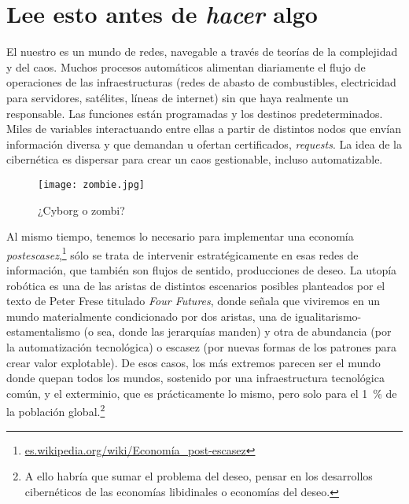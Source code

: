 \chapter{Lee esto antes de \emph{hacer} algo}
\label{cha:antesalgo}

El nuestro es un mundo de redes, navegable a través de teorías de la complejidad y del caos. Muchos procesos automáticos alimentan diariamente el flujo de operaciones de las infraestructuras (redes de abasto de combustibles, electricidad para servidores, satélites, líneas de internet) sin que haya realmente un responsable. Las funciones están programadas y los destinos predeterminados. Miles de variables interactuando entre ellas a partir de distintos nodos que envían información diversa y que demandan u ofertan certificados, \emph{requests}. La idea de la cibernética es dispersar para crear un caos gestionable, incluso automatizable.

\begin{figure}[htbp]
	\centering
	\texttt{[image: zombie.jpg]}
	\caption{¿Cyborg o zombi?}
	\label{fig:cyberzombie}
\end{figure}

Al mismo tiempo, tenemos lo necesario para implementar una economía \emph{postescasez},\footnote{\url{es.wikipedia.org/wiki/Economía\_post-escasez}} sólo se trata de intervenir estratégicamente en esas redes de información, que también son flujos de sentido, producciones de deseo. La utopía robótica es una de las aristas de distintos escenarios posibles planteados por el texto de Peter Frese titulado \emph{Four Futures}, donde señala que viviremos en un mundo materialmente condicionado por dos aristas, una de igualitarismo-estamentalismo (o sea, donde las jerarquías manden) y otra de abundancia (por la automatización tecnológica) o escasez (por nuevas formas de los patrones para crear valor explotable). De esos casos, los más extremos parecen ser el mundo donde quepan todos los mundos, sostenido por una infraestructura tecnológica común, y el exterminio, que es prácticamente lo mismo, pero solo para el 1~\% de la población global.\footnote{A ello habría que sumar el problema del deseo, pensar en los desarrollos cibernéticos de las economías libidinales o economías del deseo.}

